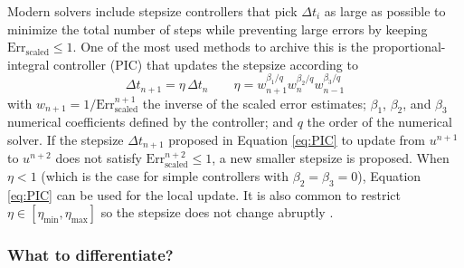 Modern solvers include stepsize controllers that pick $\Delta t_i$ as large as possible to minimize the total number of steps while preventing large errors by keeping $\text{Err}_\text{scaled} \leq 1$. 
One of the most used methods to archive this is the proportional-integral controller (PIC) that updates the stepsize according to \cite{hairer-solving-2, Ranocha_Dalcin_Parsani_Ketcheson_2022}
\begin{equation}
    \Delta t_{n+1} = \eta \, \Delta t_n
    \qquad 
    \eta = w_{n+1}^{\beta_1 / q} w_n^{\beta_2 / q} w_{n-1}^{\beta_3 / q}
    \label{eq:PIC}
\end{equation}
with $w_{n+1} = 1 / \text{Err}_\text{scaled}^{n+1}$ the inverse of the scaled error estimates; $\beta_1$, $\beta_2$, and $\beta_3$ numerical coefficients defined by the controller; and $q$ the order of the numerical solver. 
If the stepsize $\Delta t_{n+1}$ proposed in Equation \eqref{eq:PIC} to update from $u^{n+1}$ to $u^{n+2}$ does not satisfy $\text{Err}_\text{scaled}^{n+2} \leq 1$, a new smaller stepsize is proposed. 
When $\eta < 1$ (which is the case for simple controllers with $\beta_2 = \beta_3 = 0$), Equation \eqref{eq:PIC} can be used for the local update. 
It is also common to restrict $\eta \in [\eta_\text{min}, \eta_\text{max}]$ so the stepsize does not change abruptly \cite{hairer-solving-1}. 



\subsubsection{What to differentiate?}

